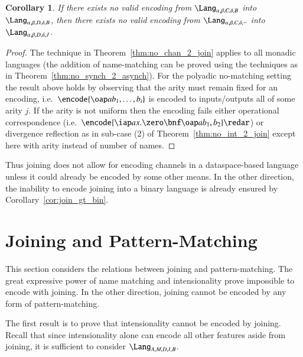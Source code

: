 \documentclass[submission,copyright,creativecommons]{eptcs}
\newtheorem{corollary}[theorem]{Corollary}
\begin{document}
\begin{corollary}
If there exists no valid encoding from
$\Lang_{\alpha,\beta,C,\delta,B}$ into $\Lang_{\alpha,\beta,D,\delta,B}$, then there exists
no valid encoding from $\Lang_{\alpha,\beta,C,\delta,-}$ into $\Lang_{\alpha,\beta,D,\delta,J}$.
\end{corollary}
\begin{proof}
The technique in Theorem~\ref{thm:no_chan_2_join} applies to all monadic languages
(the addition of name-matching can be proved using the techniques as in Theorem~\ref{thm:no_synch_2_asynch}).
For the polyadic no-matching setting the result above holds by observing that the arity must
remain fixed for an encoding, i.e.~$\encode {\oap a {b_1,\ldots,b_i}}$ is\linebreak
encoded to inputs/outputs all of
some arity $j$. If the arity is not uniform then the encoding fails\linebreak
either operational correspondence
(i.e.~$\encode {\iap a x.\zero\bnf \oap a {b_1,b_2}}\redar$)
or divergence reflection as in sub-case (2) of Theorem~\ref{thm:no_int_2_join} except here with
arity instead of number of names.
\end{proof}

Thus joining does not allow for encoding channels in a dataspace-based language unless it could already be
encoded by some other means.
In the other direction, the inability to encode joining into a binary language is already 
ensured by Corollary~\ref{cor:join_gt_bin}.


\section{Joining and Pattern-Matching}
\label{sec:join_pattern}

This section considers the relations between joining and pattern-matching.
The great expressive power of name matching \cite{G:IC08} and intensionality \cite{givenwilson:hal-01026301}
prove impossible to encode with joining.
In the other direction, joining cannot be encoded by any form of pattern-matching.

The first result is to prove that intensionality cannot be encoded by joining.
Recall that since intensionality alone can encode all other features aside from joining,
it is sufficient to consider $\Lang_{A,M,D,I,B}$.
\end{document}
